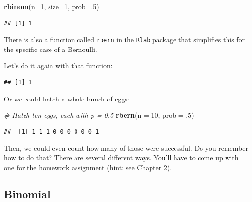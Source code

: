 \documentclass[
]{book}
\newenvironment{Shaded}{\begin{snugshade}}{\end{snugshade}}
\newcommand{\CommentTok}[1]{\textcolor[rgb]{0.56,0.35,0.01}{\textit{#1}}}
\newcommand{\DataTypeTok}[1]{\textcolor[rgb]{0.13,0.29,0.53}{#1}}
\newcommand{\DecValTok}[1]{\textcolor[rgb]{0.00,0.00,0.81}{#1}}
\newcommand{\FloatTok}[1]{\textcolor[rgb]{0.00,0.00,0.81}{#1}}
\newcommand{\KeywordTok}[1]{\textcolor[rgb]{0.13,0.29,0.53}{\textbf{#1}}}
\newcommand{\NormalTok}[1]{#1}
\begin{document}
\begin{Shaded}
\begin{Highlighting}[]
\KeywordTok{rbinom}\NormalTok{(}\DataTypeTok{n=}\DecValTok{1}\NormalTok{, }\DataTypeTok{size=}\DecValTok{1}\NormalTok{, }\DataTypeTok{prob=}\NormalTok{.}\DecValTok{5}\NormalTok{)}
\end{Highlighting}
\end{Shaded}

\begin{verbatim}
## [1] 1
\end{verbatim}

There is also a function called \texttt{rbern} in the \texttt{Rlab} package that simplifies this for the specific case of a Bernoulli.

Let's do it again with that function:

\begin{Shaded}
\end{Shaded}

\begin{verbatim}
## [1] 1
\end{verbatim}

Or we could hatch a whole bunch of eggs:

\begin{Shaded}
\begin{Highlighting}[]
\CommentTok{# Hatch ten eggs, each with p = 0.5}
\KeywordTok{rbern}\NormalTok{(}\DataTypeTok{n =} \DecValTok{10}\NormalTok{, }\DataTypeTok{prob =} \FloatTok{.5}\NormalTok{)}
\end{Highlighting}
\end{Shaded}

\begin{verbatim}
##  [1] 1 1 1 0 0 0 0 0 0 1
\end{verbatim}

Then, we could even count how many of those were successful. Do you remember how to do that? There are several different ways. You'll have to come up with one for the homework assignment (hint: see \protect\hyperlink{Chapter2}{Chapter 2}).

\hypertarget{binomial}{%
\subsection{Binomial}\label{binomial}}
\end{document}
